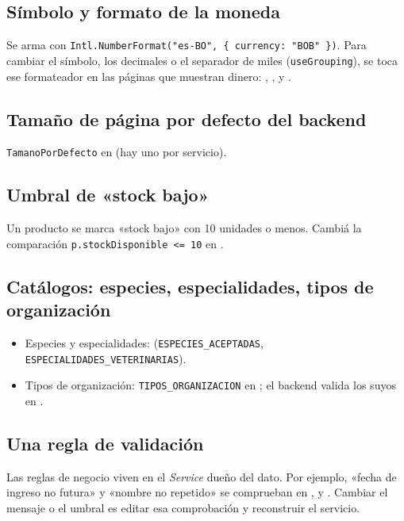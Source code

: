 \documentclass[11pt,a4paper]{article}
\begin{document}
\subsection{Símbolo y formato de la moneda}
Se arma con \texttt{Intl.NumberFormat("es-BO", \{ currency: "BOB" \})}. Para cambiar el
símbolo, los decimales o el separador de miles (\texttt{useGrouping}), se toca ese
formateador en las páginas que muestran dinero: ,
,  y .

\subsection{Tamaño de página por defecto del backend}
\texttt{TamanoPorDefecto} en  (hay uno por servicio).

\subsection{Umbral de «stock bajo»}
Un producto se marca «stock bajo» con 10 unidades o menos. Cambiá la comparación
\texttt{p.stockDisponible <= 10} en .

\subsection{Catálogos: especies, especialidades, tipos de organización}
\begin{itemize}[leftmargin=1.4em, nosep]
  \item Especies y especialidades: 
        (\texttt{ESPECIES\_ACEPTADAS}, \texttt{ESPECIALIDADES\_VETERINARIAS}).
  \item Tipos de organización: \texttt{TIPOS\_ORGANIZACION} en ; el backend valida los suyos en .
\end{itemize}

\subsection{Una regla de validación}
Las reglas de negocio viven en el \emph{Service} dueño del dato. Por ejemplo, «fecha
de ingreso no futura» y «nombre no repetido» se comprueban en ,
 y . Cambiar el mensaje o el
umbral es editar esa comprobación y reconstruir el servicio.
\end{document}
